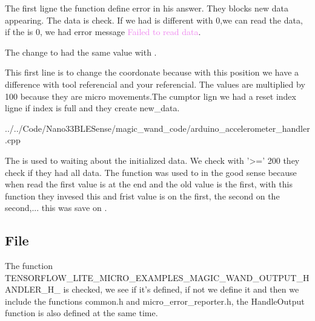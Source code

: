 The first ligne the function  define error in his answer. They blocks new data appearing.  The  data is check. If we had  is different with 0,we can read the data, if the  is 0, we had error message \textcolor{violet}{Failed to read data}. 

The  change to had the same value with . 

\begin{center}
    		
    \label{Magic Wand Arduino Accelerometer handler read data}
\end{center}

This first line is to change the coordonate because with this position we have a difference with tool referencial and your referencial. The values are multiplied by 100 because they are micro movements.The cumptor lign we had a reset index ligne if index is full and they create new\_data. 

\begin{center}
    		 {../../Code/Nano33BLESense/magic_wand_code/arduino_accelerometer_handler.cpp}
    \label{Magic Wand Arduino Accelerometer handler read data}
\end{center}

The  is used to waiting about the initialized data.
We check with  '>=' 200 they check if they had all data. 
The function  was used to  in the good sense because when  read the first value is at the end and the old value is the first, with this function they invesed this and frist value is on the first, the second on the second,... this was save on .

\subsection{File }

The function  TENSORFLOW\_LITE\_MICRO\_EXAMPLES\_MAGIC\_WAND\_OUTPUT\_HANDLER\_H\_ is checked, we see if it's defined, if not we define it and then we include the functions common.h and micro\_error\_reporter.h, the HandleOutput function is also defined at the same time. 

